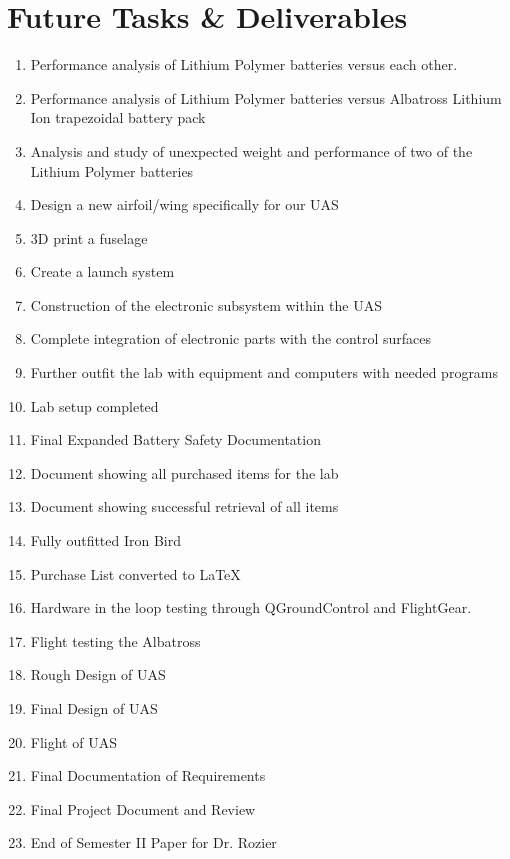 \documentclass{article}
\begin{document}
\section{Future Tasks \& Deliverables}
\begin{enumerate}
\item Performance analysis of Lithium Polymer batteries versus each other.
\item Performance analysis of Lithium Polymer batteries versus Albatross Lithium Ion trapezoidal battery pack
\item Analysis and study of unexpected weight and performance of two of the Lithium Polymer batteries
\item Design a new airfoil/wing specifically for our UAS
\item 3D print a fuselage
\item Create a launch system
\item Construction of the electronic subsystem within the UAS
\item Complete integration of electronic parts with the control surfaces
\item Further outfit the lab with equipment and computers with needed programs
\item Lab setup completed
\item Final Expanded Battery Safety Documentation
\item Document showing all purchased items for the lab 
\item Document showing successful retrieval of all items 
\item Fully outfitted Iron Bird 
\item Purchase List converted to LaTeX
\item Hardware in the loop testing through QGroundControl and FlightGear. 
\item Flight testing the Albatross
\item Rough Design of UAS
\item Final Design of UAS
\item Flight of UAS
\item Final Documentation of Requirements
\item Final Project Document and Review
\item End of Semester II Paper for Dr. Rozier
\end{enumerate}
\end{document}
